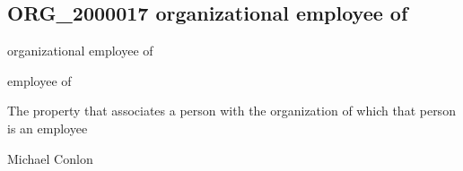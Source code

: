 \documentclass[letterpaper,10pt,english]{sphinxmanual}
\begin{document}
\subsection{ORG\_2000017 \sphinxhyphen{} organizational employee of}
\label{\detokenize{doc-ORG_2000017:org-2000017-organizational-employee-of}}\label{\detokenize{doc-ORG_2000017:index-0}}\label{\detokenize{doc-ORG_2000017::doc}}
\begin{sphinxShadowBox}

\sphinxAtStartPar
organizational employee of
\end{sphinxShadowBox}

\begin{sphinxShadowBox}

\sphinxAtStartPar
employee of
\end{sphinxShadowBox}

\begin{sphinxShadowBox}

\sphinxAtStartPar
{}
\end{sphinxShadowBox}

\begin{sphinxShadowBox}

\sphinxAtStartPar
The property that associates a person with the organization of which that person is an employee
\end{sphinxShadowBox}

\begin{sphinxShadowBox}

\sphinxAtStartPar
Michael Conlon 
\end{sphinxShadowBox}

\begin{sphinxShadowBox}

\sphinxAtStartPar
{\hyperref[\detokenize{doc-NCBITaxon_9606::doc}]{}}
\end{sphinxShadowBox}

\begin{sphinxShadowBox}

\sphinxAtStartPar
{\hyperref[\detokenize{doc-ORG_0000001::doc}]{}}
\end{sphinxShadowBox}
\end{document}
